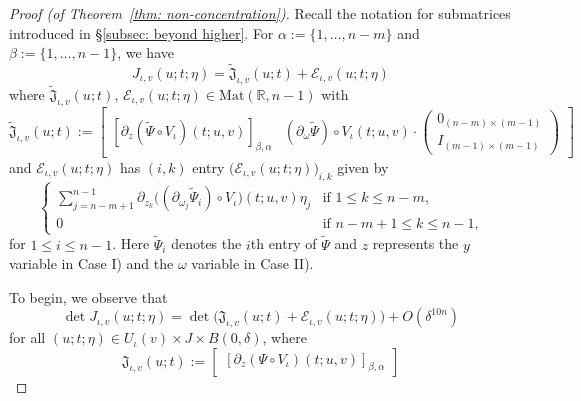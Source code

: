 \documentclass[reqno]{amsart}
\numberwithin{equation}{section}
\newcommand{\R}{\mathbb{R}}
\newcommand{\cE}{\mathcal{E}}
\newcommand{\fJ}{\mathfrak{J}}
\theoremstyle{plain}
\theoremstyle{definition}
\begin{document}
\begin{proof}[Proof (of Theorem~\ref{thm: non-concentration})]
Recall the notation for submatrices introduced in \S\ref{subsec: beyond higher}. For $\alpha := \{1,\ldots,n-m\}$ and $\beta := \{1, \dots, n-1\}$, we have
\begin{equation*}
J_{\iota, v}(u; t; \eta) = \widetilde{\fJ}_{\iota, v}(u; t) +\cE_{\iota,v}(u;t;\eta)
\end{equation*}
where $\widetilde{\fJ}_{\iota, v}(u; t)$, $\cE_{\iota,v}(u;t;\eta) \in \mathrm{Mat}(\R, n-1)$ with
\begin{equation*}
\widetilde{\fJ}_{\iota, v}(u; t):=\begin{bmatrix}
   [\partial_z(\widetilde{\Psi} \circ V_{\iota})(t;u, v)]_{\beta, \alpha}
& (\partial_\omega\widetilde{\Psi})\circ V_{\iota}(t;u,v)\cdot
\begin{pmatrix}
    0_{(n-m)\times (m-1)}\\
    I_{(m-1)\times (m-1)}
\end{pmatrix}
\end{bmatrix}
\end{equation*}
and $\cE_{\iota,v}(u;t;\eta)$ has $(i,k)$ entry $\big(\cE_{\iota,v}(u;t;\eta)\big)_{i,k}$ given by
\begin{equation*}
    \begin{cases}
\sum_{j=n-m+1}^{n-1}\partial_{z_k}\big((\partial_{\omega_j}\widetilde{\Psi}_i) \circ V_{\iota}\big)(t;u,v) \eta_j& \textrm{if $1 \leq k \leq n-m$,}\\
0& \textrm{if $n-m+1 \leq k \leq n-1$,}
    \end{cases}
\end{equation*}
for $1 \leq i \leq n-1$. Here $\widetilde{\Psi}_i$ denotes the $i$th entry of $\widetilde{\Psi}$ and $z$ represents the $y$ variable in Case I) and the $\omega$ variable in Case II).

To begin, we observe that 
\begin{equation}\label{eq: bd Jacobian 4}
\det J_{\iota, v}(u; t; \eta) = \det \big(\fJ_{\iota, v}(u; t)+\cE_{\iota,v}(u;t;\eta) \big)+ O(\delta^{10n})
\end{equation}
for all $(u;t;\eta) \in U_{\iota}(v) \times J \times B(0,\delta)$, where
\begin{equation*}
\fJ_{\iota, v}(u; t):=
\begin{bmatrix} 
   [\partial_z(\Psi \circ V_{\iota})(t;u, v)]_{\beta, \alpha}


\end{bmatrix}
\end{equation*}
\end{proof}
\end{document}
